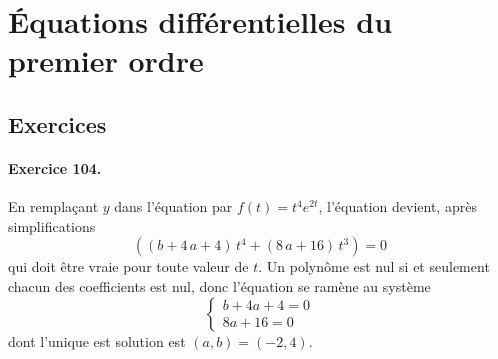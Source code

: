 
\section{Équations différentielles du premier ordre}

\subsection{Exercices}

\paragraph{Exercice 104.}
En remplaçant $y$ dans l'équation par $f(t) = t^4 e^{2t}$,
l'équation devient, après simplifications
\begin{equation*}
\left( \left( b+4\,a+4\right) \,{t}^{4}+\left( 8\,a+16\right)
\,{t}^{3}\right) = 0 
\end{equation*}
qui doit être vraie pour toute valeur de $t$. Un polynôme est nul si
et seulement chacun des coefficients est nul, donc l'équation se
ramène au système
\begin{equation*}
\begin{cases}
b + 4a + 4 = 0\\
8a + 16 = 0
\end{cases}
\end{equation*}
dont l'unique est solution est $(a,b) = (-2,4)$.

